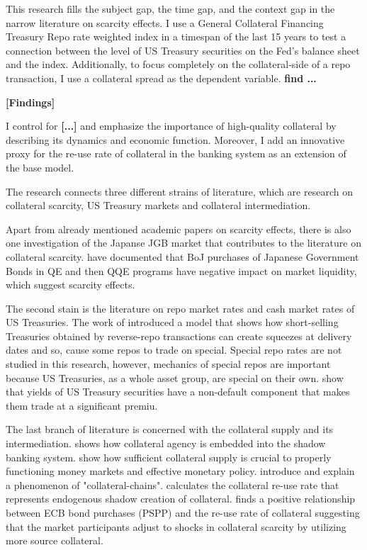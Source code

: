 \documentclass[11pt,a4paper,english,oneside]{article}
\begin{document}
This research fills the subject gap, the time gap, and the context gap in the narrow literature on scarcity effects. I use a General Collateral Financing Treasury Repo rate weighted index in a timespan of the last 15 years to test a connection between the level of US Treasury securities on the Fed's balance sheet and the index. Additionally, to focus completely on the collateral-side of a repo transaction, I use a collateral spread as the dependent variable. \citet{nyborg2019b} \textbf{find ...}

\textbf{[Findings]}

I control for \textbf{[...]} and emphasize the importance of high-quality collateral by describing its dynamics and economic function. Moreover, I add an innovative proxy for the re-use rate of collateral in the banking system as an extension of the base model.

The research connects three different strains of literature, which are research on collateral scarcity, US Treasury markets and collateral intermediation.

Apart from already mentioned academic papers on scarcity effects, there is also one investigation of the Japanse JGB market that contributes to the literature on collateral scarcity. \citet{han2018} have documented that BoJ purchases of Japanese Government Bonds in QE and then QQE programs have negative impact on market liquidity, which suggest scarcity effects.

The second stain is the literature on repo market rates and cash market rates of US Treasuries. The work of \citet{duffie1996} introduced a model that shows how short-selling Treasuries obtained by reverse-repo transactions can create squeezes at delivery dates and so, cause some repos to trade on special. Special repo rates are not studied in this research, however, mechanics of special repos are important because US Treasuries, as a whole asset group, are special on their own. \citet{krishnamurthy2012} show that yields of US Treasury securities have a non-default component that makes them trade at a significant premiu. 

The last branch of literature is concerned with the collateral supply and its intermediation. \citet{singh2011} shows how collateral agency is embedded into the shadow banking system. \citet{sissoko2020} show how sufficient collateral supply is crucial to properly functioning money markets and effective monetary policy. \citet{singh2012} introduce and explain a phenomenon of "collateral-chains". \citet{singh2017} calculates the collateral re-use rate that represents endogenous shadow creation of collateral. \citet{jank2021} finds a positive relationship between ECB bond purchases (PSPP) and the re-use rate of collateral suggesting that the market participants adjust to shocks in collateral scarcity by utilizing more source collateral.
\end{document}

